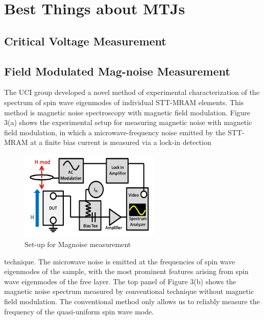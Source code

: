 \chapter{Best Things about MTJs}


\section{Critical Voltage Measurement}




\section{Field Modulated Mag-noise Measurement}


The UCI group developed a novel method of experimental characterization of the spectrum of spin wave eigenmodes of individual STT-MRAM elements. This method is magnetic noise spectroscopy with magnetic field modulation. Figure 3(a) shows the experimental setup for measuring magnetic noise with magnetic field modulation, in which a microwave-frequency noise emitted by the STT-MRAM at a finite bias current is measured via a lock-in detection

\begin{figure}[!ht]
  \centering
  \includegraphics[width=0.6\textwidth]{fig/magnoise/Picture1.png}
   \caption{Set-up for Magnoise measurement}
  \label{fig:magnoise-setup}
\end{figure}

technique. The microwave noise is emitted at the frequencies of spin wave eigenmodes of the sample, with the most prominent features arising from spin wave eigenmodes of the free layer. The top panel of Figure 3(b) shows the magnetic noise spectrum measured by conventional technique without magnetic field modulation. The conventional method only allows us to reliably measure the frequency of the quasi-uniform spin wave mode. 






